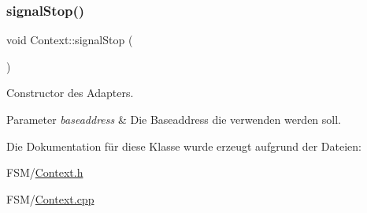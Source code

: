 \subsubsection{\texorpdfstring{signal\+Stop()}{signalStop()}\hspace{0.1cm}{\footnotesize\ttfamily [2/2]}}
{\footnotesize\ttfamily void Context\+::signal\+Stop (\begin{DoxyParamCaption}{ }\end{DoxyParamCaption})}

Constructor des Adapters.


\begin{DoxyParams}{Parameter}
{\em baseaddress} & Die Baseaddress die verwenden werden soll. \\
\hline
\end{DoxyParams}


Die Dokumentation für diese Klasse wurde erzeugt aufgrund der Dateien\+:\begin{DoxyCompactItemize}
\item 
F\+S\+M/\hyperlink{_f_s_m_2_context_8h}{Context.\+h}\item 
F\+S\+M/\hyperlink{_f_s_m_2_context_8cpp}{Context.\+cpp}\end{DoxyCompactItemize}
